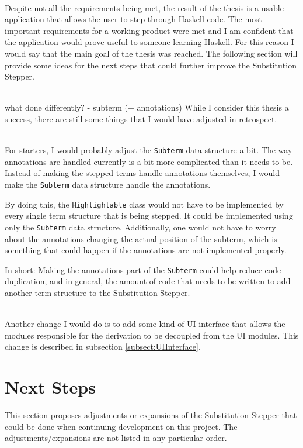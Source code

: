 \ \\
Despite not all the requirements being met,
the result of the thesis is a usable application that allows the user to step through Haskell code.
The most important requirements for a working product were met and I am confident that the application would prove useful to someone learning Haskell.
For this reason I would say that the main goal of the thesis was reached.
The following section will provide some ideas for the next steps that could further improve the Substitution Stepper.

\ \\
what done differently?
- subterm (+ annotations)
While I consider this thesis a success,
there are still some things that I would have adjusted in retrospect.

\ \\
For starters,
I would probably adjust the \texttt{Subterm} data structure a bit.
The way annotations are handled currently is a bit more complicated than it needs to be.
Instead of making the stepped terms handle annotations themselves,
I would make the \texttt{Subterm} data structure handle the annotations.

By doing this,
the \texttt{Highlightable} class would not have to be implemented by every single term structure that is being stepped.
It could be implemented using only the \texttt{Subterm} data structure.
Additionally,
one would not have to worry about the annotations changing the actual position of the subterm,
which is something that could happen if the annotations are not implemented properly.

In short: Making the annotations part of the \texttt{Subterm} could help reduce code duplication, and in general,
the amount of code that needs to be written to add another term structure to the Substitution Stepper.

\ \\
Another change I would do is to add some kind of UI interface that allows the modules responsible for the derivation to be decoupled from the UI modules.
This change is described in subsection \ref*{subsect:UIInterface}.


\section{Next Steps}

This section proposes adjustments or expansions of the Substitution Stepper that could be done when continuing development on this project.
The adjustments/expansions are not listed in any particular order.

